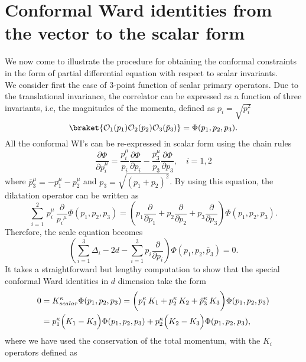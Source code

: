 \documentclass[a4paper,11pt,openright,twoside]{book}
\numberwithin{equation}{section}
\begin{document}
\section{Conformal Ward identities from the vector to the scalar form} 
We now come to illustrate the procedure for obtaining the conformal constraints in the form of partial differential equation with respect to scalar invariants.\\
We consider first the case of $3$-point function of scalar primary operators. Due to the translational invariance, the correlator can be expressed as a function of three invariants, i.e, the magnitudes of the momenta, defined as ${p}_i=\sqrt{p_i^2}$
\begin{equation}
	\braket{\mathcal{O}_1(p_1)\mathcal{O}_2(p_2)\mathcal{O}_3(\bar{p}_3)}=\Phi(p_1,p_2,p_3).
\end{equation} 
All the conformal WI's can be re-expressed in scalar form using the chain rules
\begin{equation}
	\label{chainr}
	\frac{\partial \Phi}{\partial p_i^\mu}=\frac{p_i^\mu}{  p_i}\frac{\partial\Phi}{\partial  p_i} 
	-\frac{\bar{p}_3^\mu}{  p_3}\frac{\partial\Phi}{\partial   p_3}, \quad i=1,2
\end{equation}
where $\bar{p}_3^\mu=-p_1^\mu-p_2^\mu$ and $p_3=\sqrt{(p_1+p_2)^2}$. By using this equation, the dilatation operator can be written as
\begin{equation}
	\sum_{i=1}^2\,p_i^\mu\,\frac{\partial }{{p_i}^\mu}\Phi(p_1,p_2,p_3)=\left(
	{p}_1\frac{ \partial }{\partial   p_1} +   p_2\frac{ \partial }{\partial   p_2} +   p_3\frac{ \partial }{\partial   p_3}\right)\Phi(p_1,p_2,p_3).
\end{equation}
Therefore, the scale equation becomes 
\begin{equation}
	\label{scale}
	\left(\sum_{i=1}^3\Delta_i -2 d - \sum_{i=1}^3    p_i \frac{ \partial}{\partial   p_i}\right)\Phi(p_1,p_2,\bar{p}_3)=0.
\end{equation}
It takes a straightforward but lengthy computation to show that the special conformal Ward identities in $d$ dimension take the form
\begin{align}
	0&={K}_{scalar}^{\kappa}\Phi(p_1,p_2,p_3)=\bigg(p_1^\kappa\,K_1+p_2^\kappa\,K_2+\bar{p}_3^\kappa\,K_3\bigg)\Phi(p_1,p_2,p_3)\notag\\
	&=p_1^\kappa\Big(K_1-K_3\Big)\Phi(p_1,p_2,p_3)+p_2^\kappa\Big(K_2-K_3\Big)\Phi(p_1,p_2,p_3),\label{SCWIs}
\end{align}
where we have used the conservation of the total momentum, with the $K_i$ operators defined as
\end{document}
